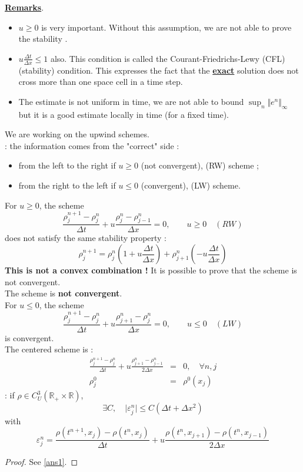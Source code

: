 \documentclass{report}
\newcommand{\R}{\ensuremath{\mathbb{R}}} %
\newcommand*{\definition}[1]{\noindent\textbf{\color{cadmiumgreen}{#1}}}
\newcommand*{\theorem}[1]{\noindent\textbf{\color{purple}{#1}}}
\theoremstyle{plain}
\theoremstyle{definition}
\theoremstyle{remark}
\begin{document}
\underline{\textbf{Remarks}}. 
\begin{itemize}
\item $u \ge 0$ is very important.
Without this assumption, we are not able to prove the stability .
\item $u\frac{\Delta t}{\Delta x} \le 1 $ also.
This condition is called the Courant-Friedrichs-Lewy (CFL) (stability) condition. This expresses the fact that the \textbf{\underline{exact}} solution does not cross more than one space cell in a time step.
\item The estimate is not uniform in time, we are not able to bound $\sup_n \Vert e^n \Vert_\infty $ but it is a good estimate locally in time (for a fixed time).
\end{itemize}
We are working on the upwind schemes.\\
\definition{Upwind} : the information comes from the "correct" side :
\begin{itemize}
\item from the left to the right if $u \ge 0$ (not convergent), (RW) scheme ;
\item from the right to the left if $u \le 0$ (convergent), (LW) scheme.
\end{itemize}
For $u \ge 0$, the scheme 
\begin{equation}
\frac{\rho^{n+1}_j - \rho^n_j}{\Delta t} + u \frac{\rho^{n}_{j} - \rho^n_{j-1}}{\Delta x} = 0,\qquad u \ge 0 \quad (RW)
\end{equation}
does not satisfy the same stability property : 
\begin{equation}
\rho_j^{n+1} = \rho^n_j (1 + u\frac{\Delta t}{\Delta x}) + \rho^n_{j+1}(-u\frac{\Delta t}{\Delta x})
\end{equation}
\textbf{This is not a convex combination ! }
It is possible to prove that the scheme is not convergent. \\
The scheme is \textbf{not convergent}. \\
For $u \le 0$, the scheme
\begin{equation}
\frac{\rho^{n+1}_j - \rho^n_j}{\Delta t} + u \frac{\rho^{n}_{j+1} - \rho^n_j}{\Delta x} = 0, \qquad u \le 0 \quad (LW)
\end{equation}
is convergent.\\
The centered scheme is : 
\begin{eqnarray}
\frac{\rho^{n+1}_j - \rho^n_j}{\Delta t} + u \frac{\rho^{n}_{j+1} - \rho^n_{j-1}}{2\Delta x} &=& 0, \quad \forall n,j \\
\rho^0_j &=& \rho^0(x_j)
\end{eqnarray}
\theorem{Lemma} : if $\rho \in C^3_U(\R_{+} \times \R)$,
\begin{equation}
\exists C,\quad \vert \varepsilon_j^n \vert \le C (\Delta t + \Delta x^2)
\end{equation}  
with 
\begin{equation}
\varepsilon^n_j = \frac{\rho(t^{n+1},x_j)-\rho(t^n,x_j)}{\Delta t} + u\frac{\rho(t^{n},x_{j+1})-\rho(t^n,x_{j-1})}{2\Delta x}
\end{equation}
\begin{proof}
	See \ref{ans1}.
\end{proof}
\end{document}
